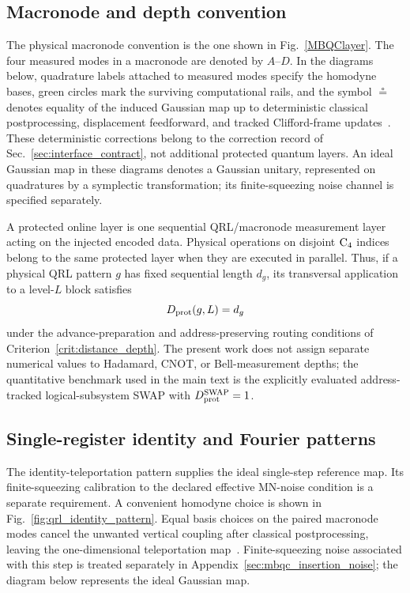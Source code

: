 \documentclass[aps,
prx,
superscriptaddress,
reprint,
longbibliography,
floatfix]{revtex4-2}
\begin{document}
\subsection{Macronode and depth convention}
The physical macronode convention is the one shown in Fig.~\ref{MBQClayer}. The four measured modes in a macronode are denoted by $A$--$D$. In the diagrams below, quadrature labels attached to measured modes specify the homodyne bases, green circles mark the surviving computational rails, and the symbol $\circeq$ denotes equality of the induced Gaussian map up to deterministic classical postprocessing, displacement feedforward, and tracked Clifford-frame updates~\cite{walshe2020continuous,MenicucciQRL2020,Walshe2021Macronode}. These deterministic corrections belong to the correction record of Sec.~\ref{sec:interface_contract}, not additional protected quantum layers. An ideal Gaussian map in these diagrams denotes a Gaussian unitary, represented on quadratures by a symplectic transformation; its finite-squeezing noise channel is specified separately.

A protected online layer is one sequential QRL/macronode measurement layer acting on the injected encoded data. Physical operations on disjoint ${\rm C_4}$ indices belong to the same protected layer when they are executed in parallel. Thus, if a physical QRL pattern $g$ has fixed sequential length $d_g$, its transversal application to a level-$L$ block satisfies
\begin{equation}
D_{\rm prot}(g,L)=d_g
\end{equation}
under the advance-preparation and address-preserving routing conditions of Criterion~\ref{crit:distance_depth}. The present work does not assign separate numerical values to Hadamard, CNOT, or Bell-measurement depths; the quantitative benchmark used in the main text is the explicitly evaluated address-tracked logical-subsystem SWAP with $D_{\rm prot}^{\rm SWAP}=1$.

\subsection{Single-register identity and Fourier patterns}
The identity-teleportation pattern supplies the ideal single-step reference map. Its finite-squeezing calibration to the declared effective MN-noise condition is a separate requirement. A convenient homodyne choice is shown in Fig.~\ref{fig:qrl_identity_pattern}. Equal basis choices on the paired macronode modes cancel the unwanted vertical coupling after classical postprocessing, leaving the one-dimensional teleportation map~\cite{walshe2020continuous,MenicucciQRL2020}. Finite-squeezing noise associated with this step is treated separately in Appendix~\ref{sec:mbqc_insertion_noise}; the diagram below represents the ideal Gaussian map.
\end{document}
